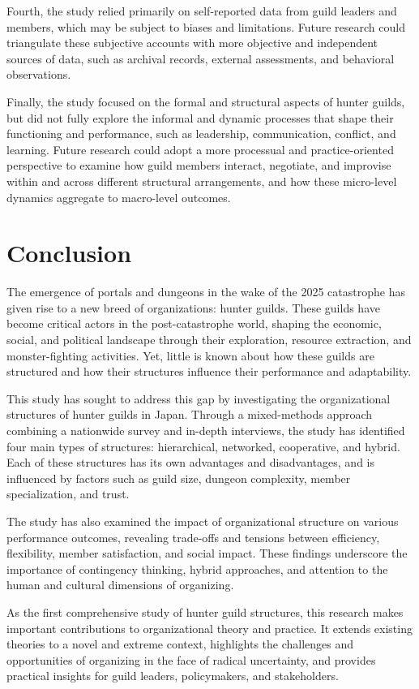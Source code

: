 \documentclass[12pt, a4paper]{article}
\begin{document}
Fourth, the study relied primarily on self-reported data from guild leaders and members, which may be subject to biases and limitations. Future research could triangulate these subjective accounts with more objective and independent sources of data, such as archival records, external assessments, and behavioral observations.

Finally, the study focused on the formal and structural aspects of hunter guilds, but did not fully explore the informal and dynamic processes that shape their functioning and performance, such as leadership, communication, conflict, and learning. Future research could adopt a more processual and practice-oriented perspective to examine how guild members interact, negotiate, and improvise within and across different structural arrangements, and how these micro-level dynamics aggregate to macro-level outcomes.

\section{Conclusion}
The emergence of portals and dungeons in the wake of the 2025 catastrophe has given rise to a new breed of organizations: hunter guilds. These guilds have become critical actors in the post-catastrophe world, shaping the economic, social, and political landscape through their exploration, resource extraction, and monster-fighting activities. Yet, little is known about how these guilds are structured and how their structures influence their performance and adaptability.

This study has sought to address this gap by investigating the organizational structures of hunter guilds in Japan. Through a mixed-methods approach combining a nationwide survey and in-depth interviews, the study has identified four main types of structures: hierarchical, networked, cooperative, and hybrid. Each of these structures has its own advantages and disadvantages, and is influenced by factors such as guild size, dungeon complexity, member specialization, and trust.

The study has also examined the impact of organizational structure on various performance outcomes, revealing trade-offs and tensions between efficiency, flexibility, member satisfaction, and social impact. These findings underscore the importance of contingency thinking, hybrid approaches, and attention to the human and cultural dimensions of organizing.

As the first comprehensive study of hunter guild structures, this research makes important contributions to organizational theory and practice. It extends existing theories to a novel and extreme context, highlights the challenges and opportunities of organizing in the face of radical uncertainty, and provides practical insights for guild leaders, policymakers, and stakeholders.
\end{document}
